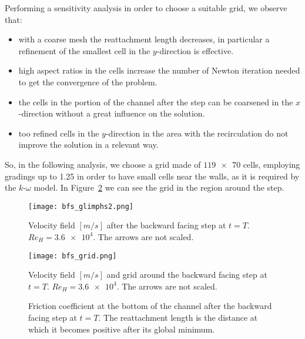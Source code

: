Performing a sensitivity analysis in order to choose a suitable grid, we observe that:
\begin{itemize}
	\item with a coarse mesh the reattachment length decreases, in particular a refinement of the smallest cell in the $y$-direction is effective.
	\item high aspect ratios in the cells increase the number of Newton iteration needed to get the convergence of the problem.
	\item the cells in the portion of the channel after the step can be coarsened in the $x$-direction without a great influence on the solution.
	\item too refined cells in the $y$-direction in the area with the 
	recirculation do not improve the solution in a relevant way.
\end{itemize}
So, in the following analysis, we choose a grid made of $\num{119x70}$ cells, employing gradings up to 1.25 in order to have small cells near the walls, as it is required by the $k\text{-}\omega$ model. In Figure~\ref{fig:bfsgrid} we can see the grid in the region around the step.

\begin{figure} %
	\centering
	\texttt{[image: bfs\_glimphs2.png]}
	\caption[Velocity field after the backward facing step]{Velocity field $[\si{m/s}]$ after the backward facing step at $t=T$. $Re_H=\num{3.6e4}$. The arrows are not scaled.}
	\label{fig:bfsarrows}
\end{figure}
\begin{figure}
	\centering
	\texttt{[image: bfs\_grid.png]}
	\caption[Velocity field and grid around the backward facing step]{Velocity field $[\si{m/s}]$ and grid around the backward facing step at $t=T$. $Re_H=\num{3.6e4}$. The arrows are not scaled.}
	\label{fig:bfsgrid}
\end{figure}
\begin{figure}[t]
	\centering
	
	\caption[Friction coefficient in the backward facing step test]{Friction coefficient at the bottom of the channel after the backward facing step at $t=T$. The reattachment length is the distance at which it becomes positive after its global minimum.}
	\label{fig:bfscf}
\end{figure}

